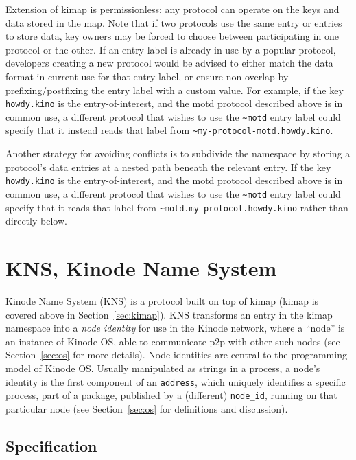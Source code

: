 \documentclass[runningheads]{llncs}
\begin{document}
Extension of kimap is permissionless: any protocol can operate on the keys and data stored in the map.
Note that if two protocols use the same entry or entries to store data, key owners may be forced to choose between participating in one protocol or the other.
If an entry label is already in use by a popular protocol, developers creating a new protocol would be advised to either match the data format in current use for that entry label, or ensure non-overlap by prefixing/postfixing the entry label with a custom value.
For example, if the key \verb|howdy.kino| is the entry-of-interest, and the motd protocol described above is in common use, a different protocol that wishes to use the \verb|~motd| entry label could specify that it instead reads that label from \verb|~my-protocol-motd.howdy.kino|.

Another strategy for avoiding conflicts is to subdivide the namespace by storing a protocol's data entries at a nested path beneath the relevant entry.
If the key \verb|howdy.kino| is the entry-of-interest, and the motd protocol described above is in common use, a different protocol that wishes to use the \verb|~motd| entry label could specify that it reads that label from \verb|~motd.my-protocol.howdy.kino| rather than directly below.


\section{KNS, Kinode Name System}
\label{sec:kns}

Kinode Name System (KNS) is a protocol built on top of kimap (kimap is covered above in Section~\ref{sec:kimap}).
KNS transforms an entry in the kimap namespace into a \textit{node identity} for use in the Kinode network, where a ``node'' is an instance of Kinode OS, able to communicate p2p with other such nodes (see Section~\ref{sec:os} for more details).
Node identities are central to the programming model of Kinode OS.
Usually manipulated as strings in a process, a node's identity is the first component of an \verb|address|, which uniquely identifies a specific process, part of a package, published by a (different) \verb|node_id|, running on that particular node (see Section~\ref{sec:os} for definitions and discussion).

\subsection{Specification}
\label{sec:knsspec}
\end{document}

